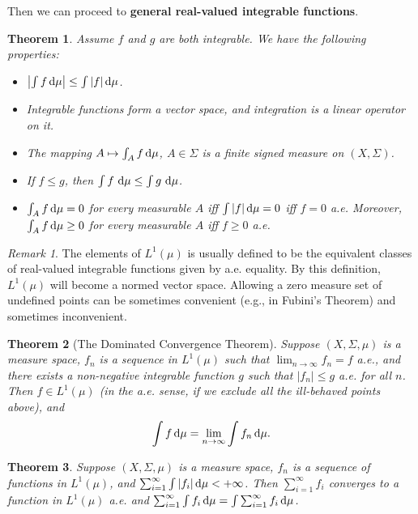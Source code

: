 \documentclass[openany]{book}
\newtheorem{theorem}{Theorem}[chapter]
\theoremstyle{definition}
\theoremstyle{remark}
\newtheorem*{remark}{Remark}
\begin{document}
Then we can proceed to \textbf{general real-valued integrable functions}.
\begin{theorem}
    Assume $f$ and $g$ are both integrable. We have the following properties:
    \begin{itemize}
        \item $\left|\int f\dif\mu\right|\le\int|f|\dif\mu$.
        \item Integrable functions form a vector space, and integration is a linear operator on it.
        \item The mapping $A\mapsto\int_Af \dif\mu$, $A\in\Sigma$ is a finite signed measure on $(X,\Sigma)$.
        \item If $f\le g$, then $\int f\,\dif\mu\le\int g\,\dif\mu$.
        \item $\int_A f \dif\mu=0$ for every measurable $A$ iff $\int|f|\dif\mu=0$ iff $f=0$ a.e. Moreover, $\int_A f \dif\mu\ge0$ for every measurable $A$ iff $f\ge0$ a.e.
    \end{itemize}
\end{theorem}
\begin{remark}
    The elements of $L^1(\mu)$ is usually defined to be the equivalent classes of real-valued integrable functions given by a.e. equality. By this definition, $L^1(\mu)$ will become a normed vector space. Allowing a zero measure set of undefined points can be sometimes convenient (e.g., in Fubini's Theorem) and sometimes inconvenient.
\end{remark}
\begin{theorem}[The Dominated Convergence Theorem]
    Suppose $(X,\Sigma,\mu)$ is a measure space, $f_n$ is a sequence in $L^1(\mu)$ such that $\lim_{n\to\infty}f_n=f$ a.e., and there exists a non-negative integrable function $g$ such that $|f_n|\le g$ a.e. for all $n$. Then $f\in L^1(\mu)$ (in the a.e. sense, if we exclude all the ill-behaved points above), and
    \begin{equation*}
        \int f \dif\mu=\lim_{n\to\infty}\int f_n \dif\mu.
    \end{equation*}
\end{theorem}
\begin{theorem}\label{thm:L1Banach}
    Suppose $(X,\Sigma,\mu)$ is a measure space, $f_n$ is a sequence of functions in $L^1(\mu)$, and $\sum_{i=1}^{\infty}\int|f_i|\dif\mu<+\infty$. Then $\sum_{i=1}^{\infty}f_i$ converges to a function in $L^1(\mu)$ a.e. and $\sum_{i=1}^{\infty}\int f_i \dif\mu=\int \sum_{i=1}^{\infty}f_i \dif\mu$.
\end{theorem}
\end{document}
